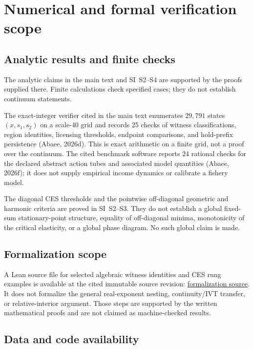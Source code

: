 \section{Numerical and formal verification scope}\label{si:verification}

\subsection{Analytic results and finite checks}

The analytic claims in the main text and SI~S2--S4 are supported by the proofs supplied there. Finite calculations check specified cases; they do not establish continuum statements.

The exact-integer verifier cited in the main text enumerates $29{,}791$ states $(x,s_1,s_2)$ on a scale-40 grid and records 25 checks of witness classifications, region identities, licensing thresholds, endpoint comparisons, and hold-prefix persistence (Abaee, 2026d). This is exact arithmetic on a finite grid, not a proof over the continuum. The cited benchmark software reports 24 rational checks for the declared abstract action tubes and associated model quantities (Abaee, 2026f); it does not supply empirical income dynamics or calibrate a fishery model.

The diagonal CES thresholds and the pointwise off-diagonal geometric and harmonic criteria are proved in SI~S2--S3. They do not establish a global fixed-sum stationary-point structure, equality of off-diagonal minima, monotonicity of the critical elasticity, or a global phase diagram. No such global claim is made.

\subsection{Formalization scope}

A Lean source file for selected algebraic witness identities and CES rung examples is available at the cited immutable source revision: \href{https://github.com/MIKEAA2020/general-sustainability/blob/6f626ee48b2a3a59282b5df5adda76c8d5993fdc/lean/Formalizations/P1_AssessmentSeparation.lean}{formalization source}. It does not formalize the general real-exponent nesting, continuity/IVT transfer, or relative-interior argument. Those steps are supported by the written mathematical proofs and are not claimed as machine-checked results.

\subsection{Data and code availability}

